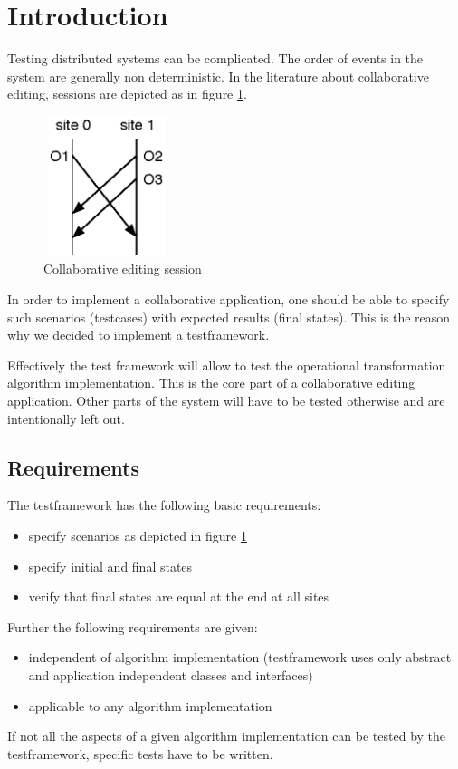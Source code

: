 \documentclass[11pt,a4paper]{article}
\begin{document}
\setlength{\parindent}{0pt}


\newpage

\tableofcontents
\newpage

\listoftables
\listoffigures
\newpage



\section{Introduction}
Testing distributed systems can be complicated. The order of events in the system are generally non deterministic. In the literature about collaborative editing, sessions are depicted as in figure \ref{fig:session}.

\begin{figure}[H]
 \centering
 \includegraphics[width=3.7cm,height=4.1cm]{../../images/testframework_puzzle.eps}
 \caption{Collaborative editing session}
 \label{fig:session}
\end{figure}

In order to implement a collaborative application, one should be able to specify such scenarios (testcases) with expected results (final states). This is the reason why we decided to implement a testframework.

Effectively the test framework will allow to test the operational transformation algorithm implementation. This is the core part of a collaborative editing application. Other parts of the system will have to be tested otherwise and are intentionally left out.


\subsection{Requirements}
The testframework has the following basic requirements:
\begin{itemize}
 \item specify scenarios as depicted in figure \ref{fig:session}
 \item specify initial and final states
 \item verify that final states are equal at the end at all sites
\end{itemize}
Further the following requirements are given:
\begin{itemize}
 \item independent of algorithm implementation (testframework uses only 
       abstract and application independent classes and interfaces)
 \item applicable to any algorithm implementation
\end{itemize}
If not all the aspects of a given algorithm implementation can be tested by the testframework, specific tests have to be written.
\end{document}
